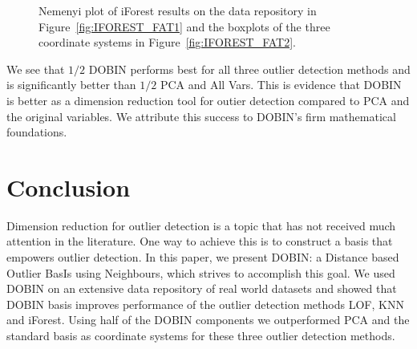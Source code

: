 \documentclass[a4paper,11pt]{article}
\begin{document}
\begin{figure}[!ht]
	\centering
	\hfill
	\caption{Nemenyi plot of iForest results on the data repository in Figure~\ref{fig:IFOREST_FAT1} and the boxplots of the three coordinate systems in Figure~\ref{fig:IFOREST_FAT2}.}
	\label{fig:IFOREST_FAT}
\end{figure}

We see that $1/2$ DOBIN performs best for all three outlier detection methods and is significantly better than $1/2$ PCA and All Vars. This is evidence that DOBIN is better as a dimension reduction tool for outier detection compared to PCA and the original variables. We attribute this success to DOBIN's firm mathematical foundations.

\section{Conclusion}

Dimension reduction for outlier detection is a topic that has not received much attention in the literature. One way to achieve this is to construct a basis that empowers outlier detection. In this paper, we present DOBIN: a Distance based Outlier BasIs using Neighbours, which strives to accomplish this goal. We used DOBIN on an extensive data repository of real world datasets and showed that DOBIN basis improves performance of the outlier detection methods LOF, KNN and iForest. Using half of the DOBIN components we outperformed PCA and the standard basis as coordinate systems for these three outlier detection methods.
\end{document}
